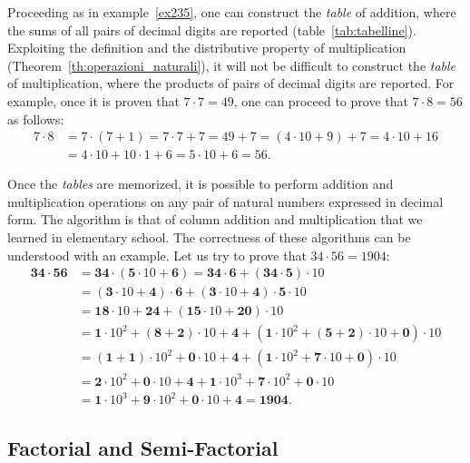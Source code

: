 Proceeding as in example~\ref{ex235}, one can construct the \emph{table}
of addition, where the sums of all pairs of decimal digits are reported
(table~\ref{tab:tabelline}).
Exploiting the definition and the distributive property of multiplication 
(Theorem~\ref{th:operazioni_naturali}),
it will not be difficult 
to construct the \emph{table} of multiplication, where the products of 
pairs of decimal digits are reported. 
For example, once it is proven that $7\cdot 7 = 49$, one can proceed 
to prove that $7\cdot 8 = 56$ as follows:
\begin{align*}
  7\cdot 8 &= 7\cdot (7+1) = 7\cdot 7 + 7 = 49+7 
  = (4\cdot 10 + 9) + 7 = 4\cdot 10 + 16 \\
  &= 4\cdot 10 + 10\cdot 1 + 6 = 5\cdot 10 + 6 = 56.
\end{align*}

Once the \emph{tables} are memorized, it is possible to perform addition 
and multiplication operations on any pair of natural numbers expressed in
decimal form.
The algorithm is that of column addition and multiplication that we learned in 
elementary school. The correctness of these algorithms can be understood with an
example.
Let us try to prove that $34\cdot 56 = 1904$:
\begin{align*}
\mathbf{34}\cdot \mathbf{56} 
  &= \mathbf{34}\cdot (\mathbf 5\cdot 10+ \mathbf 6) 
   = \mathbf{34}\cdot \mathbf 6 + (\mathbf{34}\cdot \mathbf 5) \cdot 10 \\
    &= (\mathbf 3\cdot 10 + \mathbf 4)\cdot \mathbf 6 + (\mathbf 3\cdot 10 +
  \mathbf 4)\cdot \mathbf 5 \cdot 10 \\
    &= \mathbf{18}\cdot 10 + \mathbf{24} + (\mathbf{15}\cdot 10 +
  \mathbf{20})\cdot 10 \\
    &= \mathbf{1}\cdot 10^2+(\mathbf 8+\mathbf 2)\cdot 10 + \mathbf 4 + (\mathbf
  1\cdot 10^2 + (\mathbf 5+\mathbf 2)\cdot 10 + \mathbf 0)\cdot 10 \\
    &= (\mathbf 1+\mathbf 1)\cdot 10^2 +\mathbf 0\cdot 10 + \mathbf 4 + (\mathbf
  1\cdot 10^2 + \mathbf 7\cdot 10 + \mathbf 0)\cdot 10 \\
    &= \mathbf 2\cdot 10^2 + \mathbf 0\cdot 10 + \mathbf 4 + \mathbf 1\cdot
  10^3+\mathbf 7\cdot 10^2 + \mathbf 0 \cdot 10\\
  &= \mathbf 1\cdot 10^3 + \mathbf 9\cdot 10^2 + \mathbf 0\cdot 10 + \mathbf 4
  = \mathbf{1904}.
\end{align*}

\subsection{Factorial and Semi-Factorial}


